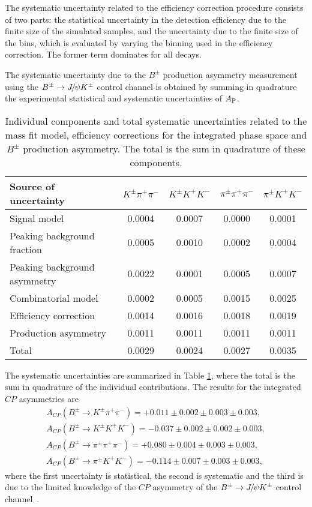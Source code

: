\documentclass[12pt,a4paper]{article}
\def\Ppi         {\ensuremath{\uppi}\xspace}
\def\Ppsi        {\ensuremath{\uppsi}\xspace}
\def\PB      {\ensuremath{\mathrm{B}}\xspace}
\def\PJ      {\ensuremath{\mathrm{J}}\xspace}
\def\PK      {\ensuremath{\mathrm{K}}\xspace}
\def\Ppi         {\ensuremath{\pi}\xspace}
\def\Ppsi        {\ensuremath{\psi}\xspace}
\def\PB      {\ensuremath{B}\xspace}
\def\PJ      {\ensuremath{J}\xspace}
\def\PK      {\ensuremath{K}\xspace}
\def\pion   {{\ensuremath{\Ppi}}\xspace}
\def\pip    {{\ensuremath{\pion^+}}\xspace}
\def\pim    {{\ensuremath{\pion^-}}\xspace}
\def\pipm   {{\ensuremath{\pion^\pm}}\xspace}
\def\kaon    {{\ensuremath{\PK}}\xspace}
\def\Kp      {{\ensuremath{\kaon^+}}\xspace}
\def\Km      {{\ensuremath{\kaon^-}}\xspace}
\def\Kpm     {{\ensuremath{\kaon^\pm}}\xspace}
\def\B       {{\ensuremath{\PB}}\xspace}
\def\Bpm     {{\ensuremath{\B^\pm}}\xspace}
\def\jpsi     {{\ensuremath{{\PJ\mskip -3mu/\mskip -2mu\Ppsi}}}\xspace}
\def\to                 {\ensuremath{\rightarrow}\xspace}
\def\CP                {{\ensuremath{C\!P}}\xspace}
\def\pipipi {\ensuremath{{\Bpm \to \pipm \pip \pim}}\xspace}
\def\kpipi {\ensuremath{{\Bpm \to \Kpm \pip \pim}}\xspace}
\def\kkpi {\ensuremath{{\Bpm \to \pipm \Kp \Km }}\xspace}
\def\kkk {\ensuremath{{\Bpm \to \Kpm \Kp \Km}}\xspace}
\def\jpsik {\ensuremath{{\Bpm \to \jpsi \Kpm}}\xspace}
\def\acp {\ensuremath{A_{\CP}}\xspace}
\def\aprod {\ensuremath{A_{\rm P}}\xspace}
\begin{document}
The systematic uncertainty related to the efficiency correction procedure consists of two parts: the statistical uncertainty in the detection efficiency due to the finite size of the simulated samples, and the uncertainty due to the finite size of the bins, which is evaluated by varying the binning used in the efficiency correction. The former term dominates for all decays.

The systematic uncertainty due to the $B^{\pm}$ production asymmetry measurement using the \jpsik control channel is obtained by summing in quadrature the experimental statistical and systematic uncertainties of \aprod.

\begin{table}[tb]
{\small
\begin{center}
\caption{Individual components and total systematic uncertainties related to the mass fit model, efficiency corrections for the integrated phase space and $B^{\pm}$ production asymmetry. The total is the sum in quadrature of these components.}
\begin{tabular}{lcccc}
\hline
Source of uncertainty & $K^{\pm}\pi^+\pi^-$ & $K^{\pm}K^+K^-$ & $\pi^{\pm}\pi^+\pi^-$ & $\pi^{\pm}K^+K^-$ \\ \hline
Signal model                 & 0.0004  & 0.0007 & 0.0000  & 0.0001 \\
Peaking background fraction  & 0.0005  & 0.0010 & 0.0002  & 0.0004 \\
Peaking background asymmetry & 0.0022  & 0.0001 & 0.0005  & 0.0007 \\
Combinatorial model          & 0.0002  & 0.0005 & 0.0015  & 0.0025 \\
Efficiency correction        & 0.0014  & 0.0016 & 0.0018  & 0.0019 \\ 
Production asymmetry           & 0.0011  & 0.0011 & 0.0011  & 0.0011 \\
\hline
Total                        & 0.0029  & 0.0024 & 0.0027  & 0.0035 \\
\hline 
\end{tabular}   
\label{tab:syst_uncert}
\end{center}}
\end{table}
The systematic uncertainties are summarized in Table \ref{tab:syst_uncert}, where the total is the sum in quadrature of the individual contributions. The results for the integrated \CP asymmetries are
\begin{align}
\acp(\kpipi)  = +0.011 \pm 0.002 \pm 0.003 \pm 0.003, \nonumber \\
\acp(\kkk)    = -0.037 \pm 0.002 \pm 0.002 \pm 0.003, \nonumber \\
\acp(\pipipi) = +0.080 \pm 0.004 \pm 0.003 \pm 0.003, \nonumber \\
\acp(\kkpi)   = -0.114 \pm 0.007 \pm 0.003 \pm 0.003, \nonumber
\end{align} 
where the first uncertainty is statistical, the second is systematic and the third is due to the limited knowledge of the \CP asymmetry of the \jpsik control channel~\cite{PDG2020}. 
\end{document}
